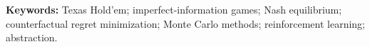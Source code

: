 \documentclass[11pt,a4paper]{article}
\theoremstyle{plain}
\theoremstyle{definition}
\theoremstyle{remark}
\begin{document}
\vspace{2pt}
\noindent\textbf{Keywords:} Texas Hold'em; imperfect-information games; Nash equilibrium; counterfactual regret minimization; Monte Carlo methods; reinforcement learning; abstraction.

\vspace{8pt}
{\small\tableofcontents}
\clearpage












\end{document}
